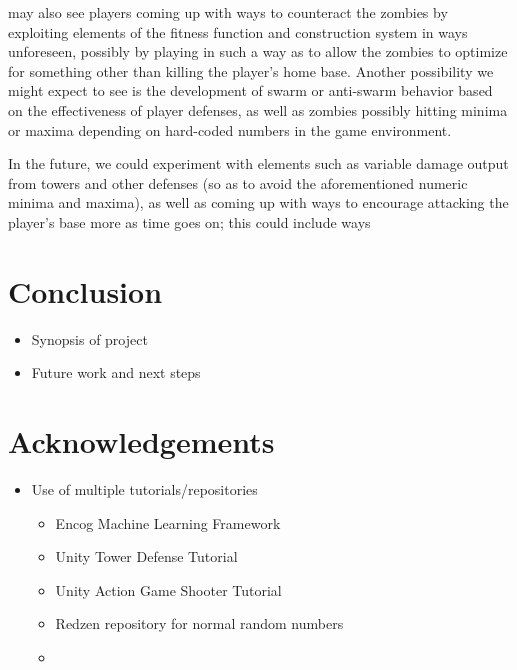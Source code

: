 \documentclass[letterpaper]{article}
\begin{document}
may also see players coming up with ways to counteract the zombies by exploiting
elements of the fitness function and construction system in ways unforeseen,
possibly by playing in such a way as to allow the zombies to optimize for
something other than killing the player's home base. Another possibility we
might expect to see is the development of swarm or anti-swarm behavior based on
the effectiveness of player defenses, as well as zombies possibly hitting minima
or maxima depending on hard-coded numbers in the game environment.

In the future, we could experiment with elements such as variable damage output
from towers and other defenses (so as to avoid the aforementioned numeric minima
and maxima), as well as coming up with ways to encourage attacking the player's
base more as time goes on; this could include ways

\section{Conclusion}
\begin{itemize}
    \item Synopsis of project
    \item Future work and next steps
\end{itemize}

\section{Acknowledgements}
\begin{itemize}
    \item Use of multiple tutorials/repositories
    \begin{itemize}
        \item Encog Machine Learning Framework
        \item Unity Tower Defense Tutorial
        \item Unity Action Game Shooter Tutorial
        \item Redzen repository for normal random numbers
        \item
    \end{itemize}
\end{itemize}

\footnotesize

\end{document}
